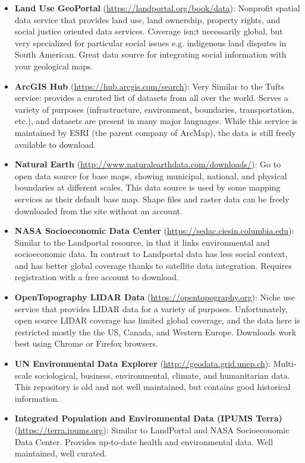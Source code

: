 \documentclass{article}
\begin{document}
\begin{itemize}
    \item \textbf{Land Use GeoPortal} (\url{https://landportal.org/book/data}): Nonprofit spatial data service that provides land use, land ownership, property rights, and social justice oriented data services. Coverage isn;t necessarily global, but very specialized for particular social issues e.g. indigenous land disputes in South American. Great data source for integrating social information with your geological maps. 
    \item \textbf{ArcGIS Hub} (\url{https://hub.arcgis.com/search}): Very Similar to the Tufts service: provides a curated list of datasets from all over the world. Serves a variety of purposes (infrastructure, environment, boundaries, transportation, etc.), and datasets are present in many major languages. While this service is maintained by ESRI (the parent company of ArcMap), the data is still freely available to download. 
    \item \textbf{Natural Earth} (\url{http://www.naturalearthdata.com/downloads/}): Go to open data source for base maps, showing municipal, national, and physical boundaries at different scales. This data source is used by some mapping services as their default base map. Shape files and raster data can be freely downloaded from the site without an account.  
    \item \textbf{NASA Socioeconomic Data Center} (\url{https://sedac.ciesin.columbia.edu}): Similar to the Landportal resource, in that it links environmental and socioeconomic data. In contrast to Landportal data has less social context, and has better global coverage thanks to satellite data integration. Requires registration with a free account to download. 
    \item \textbf{OpenTopography LIDAR Data} (\url{https://opentopography.org}): Niche use service that provides LIDAR data for a variety of purposes. Unfortunately, open source LIDAR coverage has limited global coverage, and the data here is restricted mostly the the US, Canada, and Western Europe. Downloads work best using Chrome or Firefox browsers.
    \item \textbf{UN Environmental Data Explorer} (\url{http://geodata.grid.unep.ch}): Multi-scale sociological, business, environmental, climate, and humanitarian data. This repository is old and not well maintained, but contains good historical information. 
    \item \textbf{Integrated Population and Environmental Data (IPUMS Terra)} (\url{https://terra.ipums.org}): Similar to LandPortal and NASA Socioeconomic Data Center. Provides up-to-date health and environmental data. Well maintained, well curated. 
\end{itemize}
\end{document}
